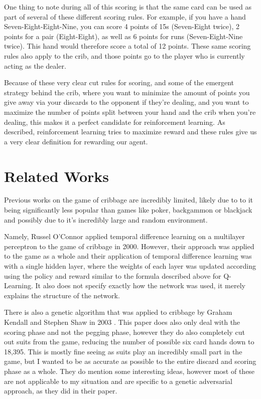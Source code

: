 \documentclass[]{article}
\begin{document}
One thing to note during all of this scoring is that the same card can be used as part of several of these different scoring rules. For example, if you have a hand Seven-Eight-Eight-Nine, you can score 4 points of 15s (Seven-Eight twice), 2 points for a pair (Eight-Eight), as well as 6 points for runs (Seven-Eight-Nine twice). This hand would therefore score a total of 12 points. These same scoring rules also apply to the crib, and those points go to the player who is currently acting as the dealer.

Because of these very clear cut rules for scoring, and some of the emergent strategy behind the crib, where you want to minimize the amount of points you give away via your discards to the opponent if they're dealing, and you want to maximize the number of points split between your hand and the crib when you're dealing, this makes it a perfect candidate for reinforcement learning. As described, reinforcement learning tries to maximize reward and these rules give us a very clear definition for rewarding our agent.

\section{Related Works}

Previous works on the game of cribbage are incredibly limited, likely due to to it being significantly less popular than games like poker, backgammon or blackjack and possibly due to it's incredibly large and random environment. 

Namely, Russel O'Connor applied temporal difference learning on a multilayer perceptron to the game of cribbage in 2000\cite{td_learning_cribbage}. However, their approach was applied to the game as a whole and their application of temporal difference learning was with a single hidden layer, where the weights of each layer was updated according using the policy and reward similar to the formula described above for Q-Learning. It also does not specify exactly how the network was used, it merely explains the structure of the network.

There is also a genetic algorithm that was applied to cribbage by Graham Kendall and Stephen Shaw in 2003 \cite{adaptive_cribbage_player}. This paper does also only deal with the scoring phase and not the pegging phase, however they do also completely cut out suits from the game, reducing the number of possible six card hands down to 18,395. This is mostly fine seeing as suits play an incredibly small part in the game, but I wanted to be as accurate as possible to the entire discard and scoring phase as a whole. They do mention some interesting ideas, however most of these are not applicable to my situation and are specific to a genetic adversarial approach, as they did in their paper.
\end{document}
